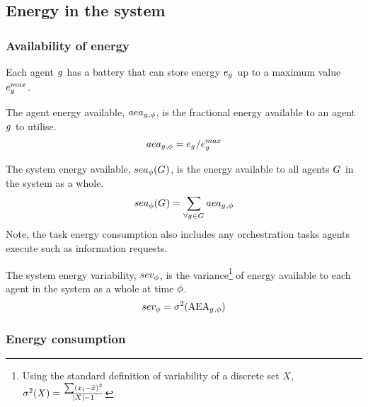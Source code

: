 
\subsection{Energy in the system}
\subsubsection{Availability of energy}

Each agent $g_{}^{}$ has a battery that can store energy $\varBatteryEnergy{}{}$ up to a maximum value $\varBatteryEnergyMax{}{}$.

\begin{definition}
	The agent energy available, $aea_{g_{}^{},\phi}$, is the fractional energy available to an agent $g_{}^{}$ to utilise.
	\begin{equation}
		\varAgentEnergyAvailable{}{} = \varBatteryEnergy{}{} / \varBatteryEnergyMax{}{}
	\end{equation}
\end{definition}

\begin{definition}
	The system energy available, $\functionSystemEnergyAvailable{}{}$, is the energy available to all agents $G_{}^{}$ in the system as a whole.
	\begin{equation}
		\functionSystemEnergyAvailable{}{} 
		= \sum_{\forall \varAgent{}{} \in \setAgents{}{}} \varAgentEnergyAvailable{\varAgent{i}{}}{}
	\end{equation}
	Note, the task energy consumption also includes any orchestration tasks agents execute such as information requests.
\end{definition}

\begin{definition}
	The system energy variability, $sev_{\phi}$, is the variance\footnote{Using the standard definition of variability of a discrete set $X$, $\sigma^2(X) = \frac{\sum (x_i - \bar{x})^2}{\lvert X \rvert-1}$} of energy available to each agent in the system as a whole at time $\phi$.
	\begin{equation}
		sev_{\phi} 
		= \sigma^2(\mathrm{AEA}_{g_{}^{},\phi})
	\end{equation}
\end{definition}

\subsubsection{Energy consumption}

